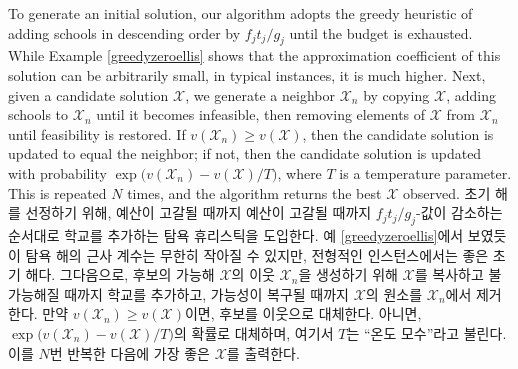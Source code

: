 \documentclass[11pt]{article} %
\theoremstyle{definition}
\theoremstyle{definition}
\begin{document}
\ifen
To generate an initial solution, our algorithm adopts the greedy heuristic of adding schools in descending order by $f_j t_j / g_j$ until the budget is exhausted. While Example \ref{greedyzeroellis} shows that the approximation coefficient of this solution can be arbitrarily small, in typical instances, it is much higher. Next, given a candidate solution $\mathcal{X}$, we generate a neighbor $\mathcal{X}_n$ by copying $\mathcal{X}$, adding schools to $\mathcal{X}_n$ until it becomes infeasible, then removing elements of $\mathcal{X}$ from $\mathcal{X}_n$ until feasibility is restored. If $v(\mathcal{X}_n) \geq v(\mathcal{X})$, then the candidate solution is updated to equal the neighbor; if not, then the candidate solution is updated with probability $\exp\bigl(v(\mathcal{X}_n) - v(\mathcal{X}) / T\bigr)$, where $T$ is a temperature parameter. This is repeated $N$ times, and the algorithm returns the best $\mathcal{X}$ observed.
\else
초기 해를 선정하기 위해, 예산이 고갈될 때까지 예산이 고갈될 때까지 $f_j t_j / g_j$-값이 감소하는 순서대로 학교를 추가하는 탐욕 휴리스틱을 도입한다. 예 \ref{greedyzeroellis}에서 보였듯이 탐욕 해의 근사 계수는 무한히 작아질 수 있지만, 전형적인 인스턴스에서는 좋은 초기 해다. 그다음으로, 후보의 가능해 $\mathcal{X}$의 이웃 $\mathcal{X}_n$을 생성하기 위해 $\mathcal{X}$를 복사하고 불가능해질 때까지 학교를 추가하고, 가능성이 복구될 때까지 $\mathcal{X}$의 원소를 $\mathcal{X}_n$에서 제거한다. 만약 $v(\mathcal{X}_n) \geq v(\mathcal{X})$이면, 후보를 이웃으로 대체한다. 아니면, $\exp\bigl(v(\mathcal{X}_n) - v(\mathcal{X}) / T\bigr)$의 확률로 대체하며, 여기서 $T$는 ``온도 모수''라고 불린다. 이를 $N$번 반복한 다음에 가장 좋은 $\mathcal{X}$를 출력한다.
\fi
\end{document}
